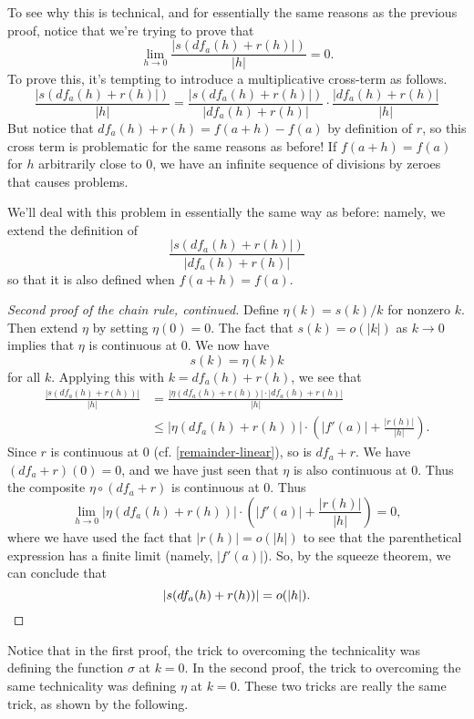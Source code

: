 To see why this is technical, and for essentially the same reasons as the previous proof, notice that we're trying to prove that
\[ \lim_{h \to 0} \frac{|s(df_a(h)+r(h)|)}{|h|} = 0.  \]
To prove this, it's tempting to introduce a multiplicative cross-term as follows. 
\[ \frac{|s(df_a(h)+r(h)|)}{|h|} = \frac{|s(df_a(h)+r(h)|)}{|df_a(h)+r(h)|} \cdot \frac{|df_a(h)+r(h)|}{|h|} \]
But notice that $df_a(h)+r(h) = f(a+h)-f(a)$ by definition of $r$, so this cross term is problematic for the same reasons as before! If $f(a+h) = f(a)$ for $h$ arbitrarily close to $0$, we have an infinite sequence of divisions by zeroes that causes problems. 

We'll deal with this problem in essentially the same way as before: namely, we extend the definition of 
\[\frac{|s(df_a(h)+r(h)|)}{|df_a(h)+r(h)|}\]
so that it is also defined when $f(a+h) = f(a)$. 

\begin{proof}[Second proof of the chain rule, continued]
	Define $\eta(k) = s(k)/k$ for nonzero $k$. Then extend $\eta$ by setting $\eta(0) = 0$. The fact that $s(k) = o(|k|)$ as $k \to 0$ implies that $\eta$ is continuous at 0. We now have \[ s(k) = \eta(k)k \]
	for all $k$. Applying this with $k = df_a(h) + r(h)$, we see that
	\[ \begin{aligned} \frac{|s(df_a(h)+r(h))|}{|h|} &= \frac{|\eta(df_a(h)+r(h))| \cdot |df_a(h)+r(h)|}{|h|} \\
	&\leq |\eta(df_a(h)+r(h))| \cdot \left( |f'(a)| + \frac{|r(h)|}{|h|} \right). \end{aligned} \]
	Since $r$ is continuous at 0 (cf. \cref{remainder-linear}), so is $df_a + r$. We have $(df_a + r)(0) = 0$, and we have just seen that $\eta$ is also continuous at $0$. Thus the composite $\eta \circ (df_a + r)$ is continuous at 0. Thus
	\[ \lim_{h \to 0} |\eta(df_a(h)+r(h))| \cdot \left( |f'(a)| + \frac{|r(h)|}{|h|} \right) = 0, \]
	where we have used the fact that $|r(h)| = o(|h|)$ to see that the parenthetical expression has a finite limit (namely, $|f'(a)|$). So, by the squeeze theorem, we can conclude that \[ |s(df_a(h)+r(h))| = o(|h|). \qedhere \]   
\end{proof}

Notice that in the first proof, the trick to overcoming the technicality was defining the function $\sigma$ at $k = 0$. In the second proof, the trick to overcoming the same technicality was defining $\eta$ at $k = 0$. These two tricks are really the same trick, as shown by the following.  

